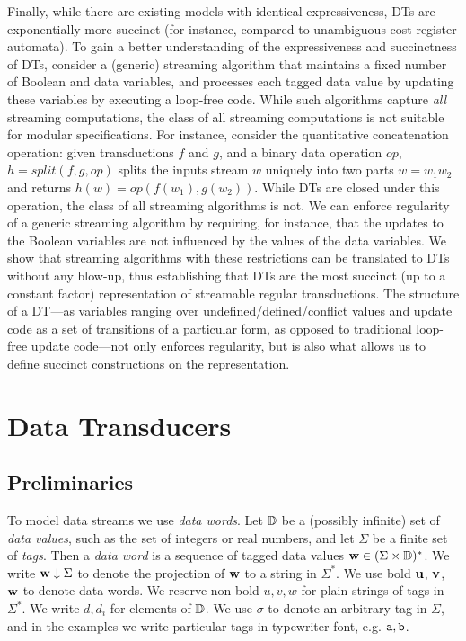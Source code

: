 Finally, while there are existing models
with identical expressiveness, DTs are exponentially more succinct (for instance, compared
to unambiguous cost register automata). To gain a better understanding of the
expressiveness and succinctness of DTs,
consider a (generic) streaming algorithm that maintains a fixed number of Boolean and data
variables, and processes each tagged data value by updating these variables by executing a loop-free
code. While such algorithms capture \emph{all} streaming computations, the class of all streaming
computations is not suitable for modular specifications.
For instance, consider the quantitative concatenation operation:
given transductions $f$ and $g$, and a binary data operation ${\textit{op}}$,
$h={\textit{split}}(f,g,{\textit{op}})$ splits the inputs stream $w$ uniquely into two parts $w=w_1w_2$ and
returns $h(w)={\textit{op}}(f(w_1),g(w_2))$.
While DTs are closed under this operation, the class
of all streaming algorithms is not.
We can enforce regularity of a generic streaming algorithm by requiring, for instance, that the updates to the Boolean
variables are not influenced by the values of the data variables. We show that streaming algorithms
with these restrictions can be translated to DTs without any blow-up, thus establishing that
DTs are the most succinct (up to a constant factor) representation of streamable regular transductions.
The structure of a DT---as variables ranging over undefined/defined/conflict values and update code as a set
of transitions of a particular form, as opposed to traditional loop-free update code---not only enforces regularity, but is also what allows us to define succinct constructions
on the representation.

\section{Data Transducers}
\label{dt:sec:model}
\label{dt:subsec:preliminaries}

\subsection{Preliminaries}

To model data streams we use \emph{data words}.
Let $\mathbb{D}$ be a (possibly infinite) set of \emph{data values},
such as the set of integers or real numbers,
and let $\Sigma$ be a finite set of \emph{tags}.
Then a \emph{data word} is a sequence of tagged data values
$\mathbf{w} \in (\Sigma \times \mathbb{D})^*$.
We write $\mathbf{w} \downarrow \Sigma$ to denote
the projection of $\mathbf{w}$ to a string in $\Sigma^*$.
We use bold $\mathbf{u}$, $\mathbf{v}$, $\mathbf{w}$ to denote data words.
We reserve non-bold $u, v, w$ for plain strings of tags in $\Sigma^*$.
We write $d, d_i$ for elements of $\mathbb{D}$.
We use $\sigma$ to denote an arbitrary tag in $\Sigma$,
and in the examples we write particular tags in typewriter font, e.g. $\texttt{a}, \texttt{b}$.

